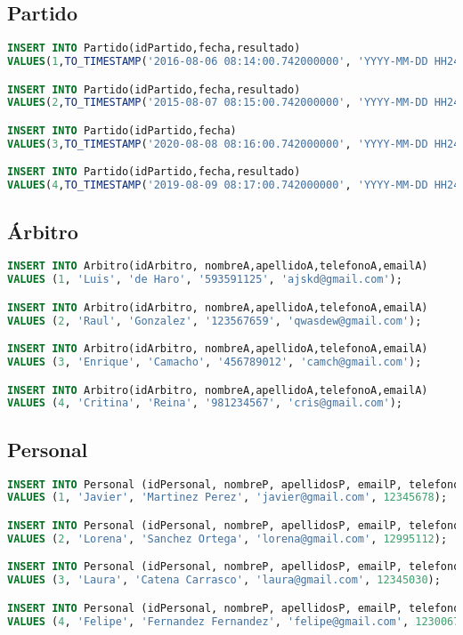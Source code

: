 \subsection{Partido}
\begin{lstlisting}[language=sql]
INSERT INTO Partido(idPartido,fecha,resultado)
VALUES(1,TO_TIMESTAMP('2016-08-06 08:14:00.742000000', 'YYYY-MM-DD HH24:MI:SS.FF'),'1-5');

INSERT INTO Partido(idPartido,fecha,resultado)
VALUES(2,TO_TIMESTAMP('2015-08-07 08:15:00.742000000', 'YYYY-MM-DD HH24:MI:SS.FF'),'2-2');

INSERT INTO Partido(idPartido,fecha)
VALUES(3,TO_TIMESTAMP('2020-08-08 08:16:00.742000000', 'YYYY-MM-DD HH24:MI:SS.FF'));

INSERT INTO Partido(idPartido,fecha,resultado)
VALUES(4,TO_TIMESTAMP('2019-08-09 08:17:00.742000000', 'YYYY-MM-DD HH24:MI:SS.FF'),'4-3');
\end{lstlisting}

\pagebreak

\subsection{Árbitro}
\begin{lstlisting}[language=sql]
INSERT INTO Arbitro(idArbitro, nombreA,apellidoA,telefonoA,emailA)
VALUES (1, 'Luis', 'de Haro', '593591125', 'ajskd@gmail.com');

INSERT INTO Arbitro(idArbitro, nombreA,apellidoA,telefonoA,emailA)
VALUES (2, 'Raul', 'Gonzalez', '123567659', 'qwasdew@gmail.com');

INSERT INTO Arbitro(idArbitro, nombreA,apellidoA,telefonoA,emailA)
VALUES (3, 'Enrique', 'Camacho', '456789012', 'camch@gmail.com');

INSERT INTO Arbitro(idArbitro, nombreA,apellidoA,telefonoA,emailA)
VALUES (4, 'Critina', 'Reina', '981234567', 'cris@gmail.com');
\end{lstlisting}

\subsection{Personal}
\begin{lstlisting}[language=sql]
INSERT INTO Personal (idPersonal, nombreP, apellidosP, emailP, telefonoP)
VALUES (1, 'Javier', 'Martinez Perez', 'javier@gmail.com', 12345678);

INSERT INTO Personal (idPersonal, nombreP, apellidosP, emailP, telefonoP)
VALUES (2, 'Lorena', 'Sanchez Ortega', 'lorena@gmail.com', 12995112);

INSERT INTO Personal (idPersonal, nombreP, apellidosP, emailP, telefonoP)
VALUES (3, 'Laura', 'Catena Carrasco', 'laura@gmail.com', 12345030);

INSERT INTO Personal (idPersonal, nombreP, apellidosP, emailP, telefonoP)
VALUES (4, 'Felipe', 'Fernandez Fernandez', 'felipe@gmail.com', 12300678);
\end{lstlisting}


